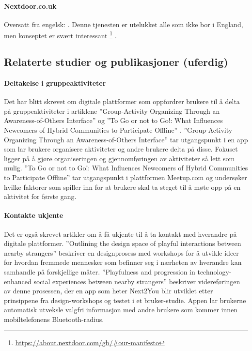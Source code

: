 \paragraph{Nextdoor.co.uk}
Oversatt fra engelsk:
. Denne tjenesten er utelukket alle som ikke bor i England, men konseptet er svært interessant \footnote{\url{https://about.nextdoor.com/gb/\#our-manifesto}} .


\subsection{Relaterte studier og publikasjoner (uferdig)}

\paragraph{Deltakelse i gruppeaktiviteter}
Det har blitt skrevet om digitale plattformer som oppfordrer brukere til å delta på gruppeaktiviteter i artiklene ''Group-Activity Organizing Through an Awareness-of-Others Interface'' \cite{AWARENESS:3:CSCW18} og ''To Go or not to Go!: What Influences Newcomers of Hybrid Communities to Participate Offline'' \cite{NEWCOMERS:4:CT17}. ''Group-Activity Organizing Through an Awareness-of-Others Interface'' tar utgangspunkt i en app som lar brukere organisere aktiviteter og andre brukere delta på disse. Fokuset ligger på å gjøre organiseringen og gjennomføringen av aktiviteter så lett som mulig. ''To Go or not to Go!: What Influences Newcomers of Hybrid Communities to Participate Offline'' tar utgangspunkt i plattformen Meetup.com og undersøker hvilke faktorer som spiller inn for at brukere skal ta steget til å møte opp på en aktivitet for første gang.

\paragraph{Kontakte ukjente}
Det er også skrevet artikler om å få ukjente til å ta kontakt med hverandre på digitale plattformer. ''Outlining the design space of playful interactions between nearby strangers'' \cite{NEARBY:5:AM16} beskriver en designprosess med workshops for å utvikle ideer for hvordan fremmede mennesker som befinner seg i nærheten av hverandre kan samhandle på forskjellige måter. ''Playfulness and progression in technology-enhanced social experiences between nearby strangers'' \cite{PLAYFUL:6:NORDICHI18} beskriver videreføringen av denne prosessen, der en app som heter Next2You blir utviklet etter prinsippene fra design-workshops og testet i et bruker-studie. Appen lar brukerne automatisk utveksle valgfri informasjon med andre brukere som kommer innen mobiltelefonens Bluetooth-radius.

